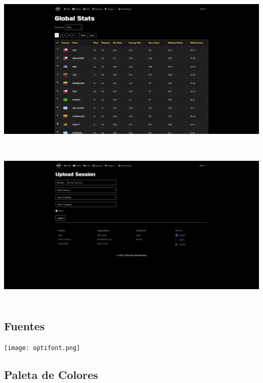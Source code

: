 \includegraphics[width=15cm, height=8cm]{img/stats.png} \\

\includegraphics[width=15cm, height=8cm]{img/upload.png}

\subsection{Fuentes}

\begin{center}
  \texttt{[image: optifont.png]}
\end{center}

\subsection{Paleta de Colores}






















